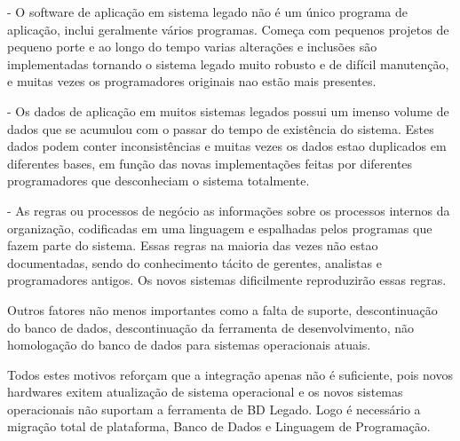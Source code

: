 - O software de aplicação em sistema legado não é um único programa de aplicação, inclui geralmente vários programas. Começa com pequenos projetos de pequeno porte e ao longo do tempo varias alterações e inclusões são implementadas tornando o sistema legado muito robusto e de difícil manutenção, e muitas vezes os programadores originais nao estão mais presentes.

- Os  dados de aplicação em muitos sistemas legados possui um imenso volume de dados que se acumulou com o passar do tempo de existência do sistema. Estes dados podem conter inconsistências e muitas vezes os dados estao duplicados em diferentes bases, em função das novas implementações feitas por diferentes programadores que desconheciam o sistema totalmente.

- As regras ou processos de negócio as informações sobre os processos internos da organização, codificadas em uma linguagem e espalhadas pelos programas que fazem parte do sistema. Essas regras na maioria das vezes não estao documentadas, sendo do conhecimento tácito de gerentes, analistas e programadores antigos. Os novos sistemas dificilmente reproduzirão essas regras.

Outros fatores não menos importantes como a falta de suporte, descontinuação do banco de dados, descontinuação da ferramenta de desenvolvimento, não homologação do banco de dados para sistemas operacionais atuais. 

Todos estes motivos reforçam que a integração apenas não é suficiente, pois novos hardwares exitem atualização de sistema operacional e os novos sistemas operacionais não suportam a ferramenta de BD Legado. Logo é necessário a migração total de plataforma, Banco de Dados e Linguagem de Programação.

